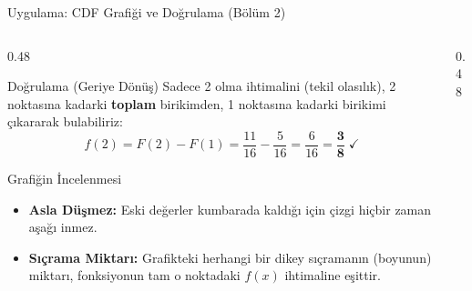 \documentclass[light]{lutbeamer}
\begin{document}
\begin{frame}{Uygulama: CDF Grafiği ve Doğrulama (Bölüm 2)}
    \footnotesize
    \begin{columns}[T]
        \begin{column}{0.48\textwidth}
            \begin{block}{Doğrulama (Geriye Dönüş)}
              Sadece 2 olma ihtimalini (tekil olasılık), 2 noktasına kadarki \textbf{toplam} birikimden, 1 noktasına kadarki birikimi çıkararak bulabiliriz:
              \[
              f(2) = F(2) - F(1) = \frac{11}{16} - \frac{5}{16} = \frac{6}{16} = \mathbf{\frac{3}{8}} \;\checkmark
              \]
            \end{block}
            
            \vspace{0.3cm}
            \begin{exampleblock}{Grafiğin İncelenmesi}
                \begin{itemize}
                    \item \textbf{Asla Düşmez:} Eski değerler kumbarada kaldığı için çizgi hiçbir zaman aşağı inmez.
                    \item \textbf{Sıçrama Miktarı:} Grafikteki herhangi bir dikey sıçramanın (boyunun) miktarı, fonksiyonun tam o noktadaki $f(x)$ ihtimaline eşittir.
                \end{itemize}
            \end{exampleblock}
        \end{column}
        
        \begin{column}{0.48\textwidth}
            \centering
        \end{column}
    \end{columns}
\end{frame}
\end{document}
